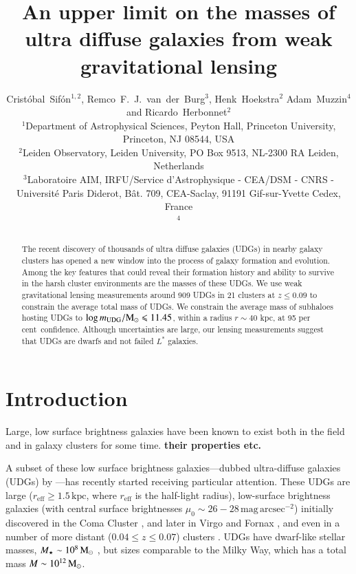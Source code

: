 \documentclass[usenatbib,fleqn]{mnras}
\title[Weak lensing masses of UDGs]{An upper limit on the masses of ultra diffuse galaxies from weak gravitational lensing}
\author[C.\ Sif\'on, R.\ F.\ J.\ van der Burg, H.\ Hoekstra, A.\ Muzzin \& R.\ Herbonnet]
  {
      Crist\'obal~Sif\'on$^{1,2}$,
      Remco~F.~J.~van~der~Burg$^3$,
      Henk~Hoekstra$^2$
      Adam~Muzzin$^4$
      and
      \newauthor
      Ricardo~Herbonnet$^2$
\\
      $^1$Department of Astrophysical Sciences, Peyton Hall, Princeton University, Princeton, NJ 08544, USA\\
      $^2$Leiden Observatory, Leiden University, PO Box 9513, NL-2300 RA Leiden, Netherlands\\
      $^3$Laboratoire AIM, IRFU/Service d'Astrophysique - CEA/DSM - CNRS - Universit\'e Paris Diderot, B\^at. 709, CEA-Saclay, 91191 Gif-sur-Yvette Cedex, France\\
      $^4$
  }
\def\percent{ per cent}
\def\reff{r_\mathrm{eff}}
\begin{document}
\label{firstpage}
\pagerange{\pageref{firstpage}--\pageref{lastpage}}

\maketitle

\begin{abstract}
        The recent discovery of thousands of ultra diffuse galaxies (UDGs) in nearby galaxy clusters has opened a new window into the process of galaxy formation and evolution. Among the key features that could reveal their formation history and ability to survive in the harsh cluster environments are the masses of these UDGs. We use weak gravitational lensing measurements around 909 UDGs in 21 clusters at $z\leq0.09$ to constrain the average total mass of UDGs. We constrain the average mass of subhaloes hosting UDGs to $\log m_{\rm UDG}/\mathrm{M}_\odot\leqslant11.45$, within a radius $r\sim40$ kpc, at 95\percent\ confidence. Although uncertainties are large, our lensing measurements suggest that UDGs are dwarfs and not failed $L^*$ galaxies.
\end{abstract}

\section{Introduction}
\label{s:intro}

Large, low surface brightness galaxies have been known to exist both in the field \citep{} and in galaxy clusters \citep{} for some time. \textbf{their properties etc.}

A subset of these low surface brightness galaxies---dubbed ultra-diffuse galaxies (UDGs) by \cite{vandokkum15_coma}---has recently started receiving particular attention. These UDGs are large ($\reff\geq1.5\,\mathrm{kpc}$, where $\reff$ is the half-light radius), low-surface brightness galaxies (with central surface brightnesses $\mu_0\sim26-28\,\mathrm{mag\,arcsec^{-2}}$) initially discovered in the Coma Cluster \citep{vandokkum15_coma,koda15,yagi16}, and later in Virgo \citep{mihos15} and Fornax \citep{munoz15}, and even in a number of more distant ($0.04\leq z \leq0.07$) clusters \citep{vdburg16}. %
UDGs have dwarf-like stellar masses, $M_\star\sim10^8\,\mathrm{M}_\odot$ \citep[e.g.,][]{vdburg16}, but sizes comparable to the Milky Way, which has a total mass $M\sim10^{12}\,\mathrm{M}_\odot$.
\end{document}
